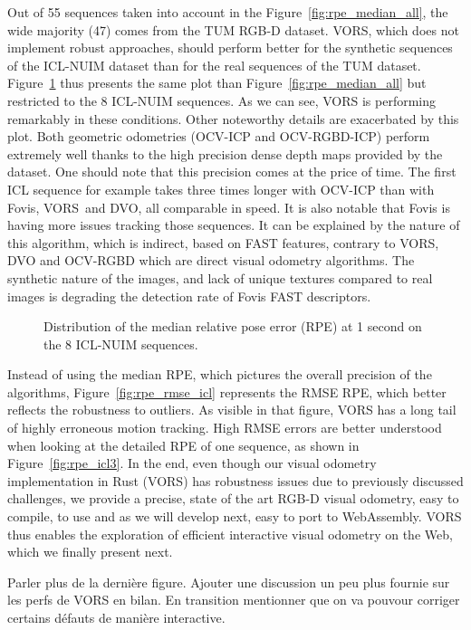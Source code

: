 Out of 55 sequences taken into account in the Figure~\ref{fig:rpe_median_all},
the wide majority (47) comes from the TUM RGB-D dataset.
VORS, which does not implement robust approaches,
should perform better for the synthetic sequences of the ICL-NUIM dataset than
for the real sequences of the TUM dataset.
Figure~\ref{fig:rpe_median_icl} thus presents the same plot than
Figure~\ref{fig:rpe_median_all} but restricted to the 8 ICL-NUIM sequences.
As we can see, VORS is performing remarkably in these conditions.
Other noteworthy details are exacerbated by this plot.
Both geometric odometries (OCV-ICP and OCV-RGBD-ICP) perform extremely well
thanks to the high precision dense depth maps provided by the dataset.
One should note that this precision comes at the price of time.
The first ICL sequence for example takes three times longer
with OCV-ICP than with Fovis, VORS and DVO, all comparable in speed.
It is also notable that Fovis is having more issues tracking those sequences.
It can be explained by the nature of this algorithm, which is indirect,
based on FAST features, contrary to VORS, DVO and OCV-RGBD which are
direct visual odometry algorithms.
The synthetic nature of the images, and lack of unique textures compared
to real images is degrading the detection rate of Fovis FAST descriptors.

\begin{figure}[ht]
	\centering
	
	\caption{Distribution of the median relative pose error (RPE) at 1 second
	on the 8 ICL-NUIM sequences.}%
	\label{fig:rpe_median_icl}
\end{figure}

Instead of using the median RPE,
which pictures the overall precision of the algorithms,
Figure~\ref{fig:rpe_rmse_icl} represents the RMSE RPE,
which better reflects the robustness to outliers.
As visible in that figure, VORS has a long tail of highly
erroneous motion tracking.
High RMSE errors are better understood when looking at the
detailed RPE of one sequence, as shown in Figure~\ref{fig:rpe_icl3}.
In the end, even though our visual odometry implementation in Rust (VORS)
has robustness issues due to previously discussed challenges,
we provide a precise, state of the art RGB-D visual odometry,
easy to compile, to use and as we will develop next,
easy to port to WebAssembly.
VORS thus enables the exploration of efficient interactive
visual odometry on the Web, which we finally present next.

\alert{Parler plus de la dernière figure.
Ajouter une discussion un peu plus fournie
sur les perfs de VORS en bilan.
En transition mentionner que on va pouvour corriger certains
défauts de manière interactive.}

